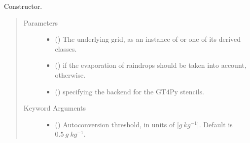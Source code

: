 \documentclass[letterpaper,10pt,english]{sphinxmanual}
\begin{document}
\begin{fulllineitems}
\begin{fulllineitems}
\begin{quote}
\begin{description}
\begin{itemize}
\begin{itemize}
\end{itemize}

\end{itemize}


\end{description}\end{quote}

\end{fulllineitems}


\begin{fulllineitems}
\label{\detokenize{api:tasmania.parameterizations.adjustment_microphysics_kessler_wrf.AdjustmentMicrophysicsKesslerWRF.__init__}}
Constructor.
\begin{quote}\begin{description}
\item[{Parameters}] \leavevmode\begin{itemize}
\item {} 
 () \textendash{} The underlying grid, as an instance of {\hyperref[\detokenize{api:tasmania.grids.grid_xyz.GridXYZ}]{}} or one of its derived classes.

\item {} 
 () \textendash{}  if the evaporation of raindrops should be taken into account,  otherwise.

\item {} 
 () \textendash{}  specifying the backend for the GT4Py stencils.

\end{itemize}

\item[{Keyword Arguments}] \leavevmode\begin{itemize}
\item {} 
 () \textendash{} Autoconversion threshold, in units of {[}\(g ~ kg^{-1}\){]}. Default is \(0.5 ~ g ~ kg^{-1}\).


\end{itemize}
\end{description}
\end{quote}
\end{fulllineitems}
\end{fulllineitems}
\end{document}
